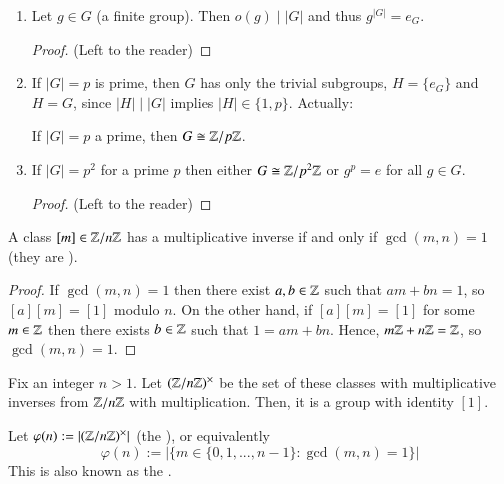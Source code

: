 \documentclass[12pt, a4paper, oneside, openright, titlepage]{book}
\begin{document}
\begin{eg}
        \leavevmode
        \begin{enumerate}
                \item Let $g \in G$ (a finite group). Then $o(g)\;\vert\;|G|$ and thus $g^{|G|} = e_G$.
                        \begin{proof}
                                (Left to the reader)
                        \end{proof}
                \item If $|G| = p$ is prime, then $G$ has only the trivial subgroups, $H = \{e_G\}$ and $H = G$, since $|H|\;\vert\;|G|$ implies $|H| \in \{1,p\}$. Actually:
                        \begin{cor}
                                If $|G| = p$ a prime, then $G \cong \mathbb Z/p\mathbb Z$.
                        \end{cor}
                \item If $|G| = p^2$ for a prime $p$ then either $G \cong \mathbb Z/p^2\mathbb Z$ or $g^p = e$ for all $g \in G$.
                        \begin{proof}
                                (Left to the reader)
                        \end{proof}
        \end{enumerate}
\end{eg}


\begin{rmk}
        A class $[m] \in \mathbb Z/n\mathbb Z$ has a multiplicative inverse if and only if $\gcd(m,n) = 1$ (they are ).
\end{rmk}
\begin{proof}
        If $\gcd(m,n) = 1$ then there exist $a,b \in \mathbb Z$ such that $am + bn = 1$, so $[a][m] = [1]$ modulo $n$. On the other hand, if $[a][m] = [1]$ for some $m \in \mathbb Z$ then there exists $b \in \mathbb Z$ such that $1 = am+bn$. Hence, $m\mathbb Z + n\mathbb Z = \mathbb Z$, so $\gcd(m,n) = 1$.
\end{proof}

\begin{defn}
        Fix an integer $n > 1$. Let $(\mathbb Z/n\mathbb Z)^{\times}$ be the set of these classes with multiplicative inverses from $\mathbb Z/n\mathbb Z$ with multiplication. Then, it is a group with identity $[1]$.
\end{defn}

\begin{defn}
        Let $\varphi(n) :=|(\mathbb Z/n\mathbb Z)^{\times}|$ (the ), or equivalently \begin{equation}
                \varphi(n) := |\{m \in \{0,1,...,n-1\}:\gcd(m,n) = 1\}|
        \end{equation}
        This is also known as the .
\end{defn}
\end{document}
